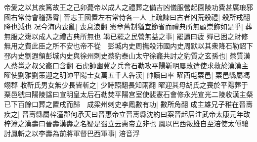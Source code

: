 帝愛之以其疾篤故王之己卯薨帝以成人之禮葬之備吉凶儀服營起園陵功費甚廣琅邪國右常侍會稽孫霄|{
	晉志王國置左右常侍各一人}
上疏諫曰古者凶荒殺禮|{
	殺所戒翻降也減也}
况今海内喪亂|{
	喪息浪翻}
憲章舊制猶宜節省而禮典所無顧崇飾如是乎|{
	葬無服之殤以成人之禮古典所無也}
竭已罷之民營無益之事|{
	罷讀曰疲}
殫已困之財修無用之費此臣之所不安也帝不從　彭城内史周撫殺沛國内史周默以其衆降石勒詔下邳内史劉遐領彭城内史與徐州刺史蔡豹泰山太守徐龕共討之豹質之玄孫也|{
	蔡質漢人蔡邕之叔父龕口含翻}
石虎帥幽冀之兵會石勒攻平陽靳明屢敗遣使求救於漢漢主曜使劉雅劉策迎之明帥平陽士女萬五千人犇漢|{
	帥讀曰率}
曜西屯粟邑|{
	粟邑縣屬馮翊郡}
收靳氏男女無少長皆斬之|{
	少詩照翻長知兩翻}
曜迎其母胡氏之喪於平陽葬于粟邑號曰陽陵諡曰宣明皇太后石勒焚平陽宫室使裴憲石會修永光宣光二陵收漢主粲已下百餘口葬之置戌而歸　成梁州刺史李鳳數有功|{
	數所角翻}
成主雄兄子稚在晉壽疾之|{
	晉壽縣屬梓潼郡何承天曰晉惠帝立晉夀縣沈約曰案晉起居注武帝太康元年改梓潼之漢壽曰晉壽漢夀之名疑是蜀立云惠帝立非也}
鳳以巴西叛雄自至涪使太傅驤討鳳斬之以李壽為前將軍督巴西軍事|{
	涪音浮}


